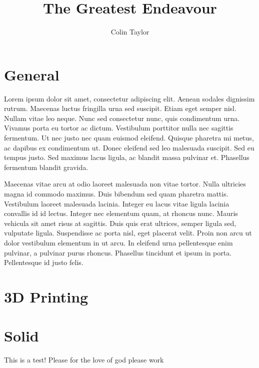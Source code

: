 \documentclass{report}
\title{The Greatest Endeavour}
\author{Colin Taylor}
\begin{document}
\maketitle
\chapter{General}
Lorem ipsum dolor sit amet, consectetur adipiscing elit. Aenean sodales dignissim rutrum. Maecenas luctus fringilla urna sed suscipit. Etiam eget semper nisl. Nullam vitae leo neque. Nunc sed consectetur nunc, quis condimentum urna. Vivamus porta eu tortor ac dictum. Vestibulum porttitor nulla nec sagittis fermentum. Ut nec justo nec quam euismod eleifend. Quisque pharetra mi metus, ac dapibus ex condimentum ut. Donec eleifend sed leo malesuada suscipit. Sed eu tempus justo. Sed maximus lacus ligula, ac blandit massa pulvinar et. Phasellus fermentum blandit gravida.

Maecenas vitae arcu at odio laoreet malesuada non vitae tortor. Nulla ultricies magna id commodo maximus. Duis bibendum sed quam pharetra mattis. Vestibulum laoreet malesuada lacinia. Integer eu lacus vitae ligula lacinia convallis id id lectus. Integer nec elementum quam, at rhoncus nunc. Mauris vehicula sit amet risus at sagittis. Duis quis erat ultrices, semper ligula sed, vulputate ligula. Suspendisse ac porta nisl, eget placerat velit. Proin non arcu ut dolor vestibulum elementum in ut arcu. In eleifend urna pellentesque enim pulvinar, a pulvinar purus rhoncus. Phasellus tincidunt et ipsum in porta. Pellentesque id justo felis.
\chapter{3D Printing}
\chapter{Solid}
This is a test!
Please for the love of god please work
\end{document}
